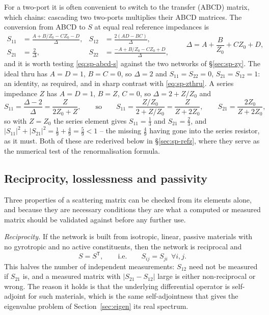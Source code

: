 For a two-port it is often convenient to switch to the transfer (ABCD) matrix, which chains: cascading two
two-ports multiplies their ABCD matrices. The conversion from ABCD to $S$ at equal real reference impedances is
\begin{equation}
  \begin{aligned}
    S_{11} &= \frac{A + B/Z_0 - C Z_0 - D}{\Delta}, &
    S_{12} &= \frac{2(AD-BC)}{\Delta}, \\
    S_{21} &= \frac{2}{\Delta}, &
    S_{22} &= \frac{-A + B/Z_0 - C Z_0 + D}{\Delta},
  \end{aligned}
  \qquad
  \Delta = A + \frac{B}{Z_0} + C Z_0 + D ,
  \label{eq:sp-abcd-s}
\end{equation}
and it is worth testing \eqref{eq:sp-abcd-s} against the two networks of \S\ref{sec:sp-zy}. The ideal thru has
$A=D=1$, $B=C=0$, so $\Delta=2$ and $S_{11}=S_{22}=0$, $S_{21}=S_{12}=1$: an identity, as required, and in
sharp contrast with \eqref{eq:sp-zthru}. A series impedance $Z$ has $A=D=1$, $B=Z$, $C=0$, so
$\Delta=2+Z/Z_0$ and
\begin{equation}
  S_{11} = \frac{\Delta-2}{\Delta} = \frac{Z}{2Z_0+Z},
         \qquad\text{so}\qquad
         S_{11} = \frac{Z/Z_0}{2+Z/Z_0} = \frac{Z}{Z+2Z_0} ,
  \qquad
  S_{21} = \frac{2Z_0}{Z+2Z_0} ,
  \label{eq:sp-series-z}
\end{equation}
so with $Z=Z_0$ the series element gives $S_{11}=\tfrac13$ and $S_{21}=\tfrac23$, and
$|S_{11}|^2+|S_{21}|^2=\tfrac19+\tfrac49=\tfrac59<1$ -- the missing $\tfrac49$ having gone into the series
resistor, as it must. Both of these are rederived below in \S\ref{sec:sp-refz}, where they serve as the
numerical test of the renormalisation formula.

\subsection{Reciprocity, losslessness and passivity}
\label{sec:sp-properties}

Three properties of a scattering matrix can be checked from its elements alone, and because they are necessary
conditions they are what a computed or measured matrix should be validated against before any further use.

\emph{Reciprocity.} If the network is built from isotropic, linear, passive materials with no gyrotropic and no
active constituents, then the network is reciprocal and
\begin{equation}
  S = S^{\mathsf{T}} ,
  \qquad\text{i.e.}\qquad S_{ij} = S_{ji}\ \ \forall i,j .
  \label{eq:sp-reciprocity}
\end{equation}
This halves the number of independent measurements: $S_{12}$ need not be measured if $S_{21}$ is, and a measured
matrix with $|S_{21}-S_{12}|$ large is either non-reciprocal or wrong. The reason it holds is that the underlying
differential operator is self-adjoint for such materials, which is the same self-adjointness that gives the
eigenvalue problem of Section~\ref{sec:eigen} its real spectrum.

